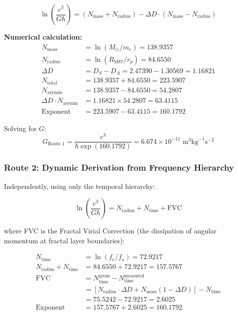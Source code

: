 \documentclass[11pt,a4paper]{article}
\begin{document}
\begin{equation}
  \boxed{
  \ln\left(\frac{c^3}{G\hbar}\right) = (N_{\text{mass}} + N_{\text{radius}})
  - \Delta D \cdot (N_{\text{mass}} - N_{\text{radius}})
  }
\end{equation}

\noindent\textbf{Numerical calculation:}
\begin{align*}
  N_{\text{mass}}   &= \ln(M_\odot/m_e) = 138.9357 \\
  N_{\text{radius}} &= \ln(R_{\text{M87}}/r_p) = 84.6550 \\
  \Delta D          &= D_S - D_A = 2.47390 - 1.30569 = 1.16821 \\
  N_{\text{total}}  &= 138.9357 + 84.6550 = 223.5907 \\
  N_{\text{asymm}}  &= 138.9357 - 84.6550 = 54.2807 \\
  \Delta D \cdot N_{\text{asymm}} &= 1.16821 \times 54.2807 = 63.4115 \\
  \text{Exponent}   &= 223.5907 - 63.4115 = 160.1792
\end{align*}

\noindent Solving for $G$:
\begin{equation}
  G_{\text{Route 1}} = \frac{c^3}{\hbar \exp(160.1792)} = 6.674 \times 10^{-11}
  \text{ m}^3\text{kg}^{-1}\text{s}^{-2}
\end{equation}

\subsubsection{Route 2: Dynamic Derivation from Frequency Hierarchy}

Independently, using only the temporal hierarchy:

\begin{equation}
  \ln\left(\frac{c^3}{G\hbar}\right) = N_{\text{radius}} + N_{\text{time}} + \text{FVC}
\end{equation}

where FVC is the Fractal Virial Correction (the dissipation of angular momentum at
fractal layer boundaries):

\begin{align*}
  N_{\text{time}} &= \ln(f_e/f_\star) = 72.9217 \\
  N_{\text{radius}} + N_{\text{time}} &= 84.6550 + 72.9217 = 157.5767 \\
  \text{FVC} &= N_{\text{time}}^{\text{geom}} - N_{\text{time}}^{\text{measured}} \\
  &= [N_{\text{radius}} \cdot \Delta D + N_{\text{mass}}(1-\Delta D)] - N_{\text{time}} \\
  &= 75.5242 - 72.9217 = 2.6025 \\
  \text{Exponent} &= 157.5767 + 2.6025 = 160.1792
\end{align*}
\end{document}
